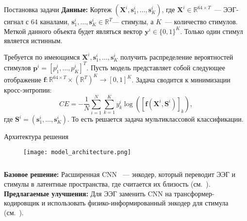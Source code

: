 \documentclass{beamer}
\begin{document}
\begin{frame}{Постановка задачи}
\textbf{Данные:} Кортеж $(\mathbf{X}^i, \mathbf{s}_1^i, \dots, \mathbf{s}_K^i)$, где $\mathbf{X}^i \in \mathbb{R}^{64 \times T}$~--- ЭЭГ-сигнал с 64 каналами, $\mathbf{s}_1^i, \dots, \mathbf{s}_K^i \in \mathbb{R}^{T}$--- стимулы, а $K$~--- количество стимулов. Меткой данного объекта будет являться вектор $\mathbf{y}^i \in \{0, 1\}^K$. Только один стимул является истинным. \bigskip

Требуется по имеющимся $\mathbf{X}^i, \mathbf{s}_1^i, \dots, \mathbf{s}_K^i$ получить распределение вероятностей стимулов $\mathbf{p}^i = [p_1^i, \dots , p_K^i]^T$. Пусть модель представляет собой следующее отображение $\mathbf{f} : \mathbb{R}^{64 \times T} \times \left( \mathbb{R}^{T} \right)^K \rightarrow [0, 1]^K$. Задача сводится к минимизации кросс-энтропии:
    $$CE = - \frac{1}{N}\sum_{i=1}^N\sum_{k=1}^K y_k^i \log \left( \left[ \mathbf{f}(\mathbf{X}^i, \mathbf{S}^i) \right]_k \right),$$
    где $\mathbf{S}^i = (\mathbf{s}^i_1, \dots, \mathbf{s}^i_K)$. То есть решается задача мультиклассовой классификации.

\end{frame}
\begin{frame}{Архитектура решения}
\begin{figure}[t]
        \centering
        \texttt{[image: model\_architecture.png]}
\end{figure}
\begin{columns}[c]
     \textbf{Базовое решение:} Расширенная CNN ~--- энкодер, который переводит ЭЭГ и стимулы в латентные пространства, где считается их близость (см.~\citep{Accou2021ModelingTR}).
     \textbf{Предлагаемые улучшения:}
     Для ЭЭГ заменить CNN на трансформер-кодировщик и использовать физико-информированный энкодер для стимула (см.~\citep{multihead-gru}). 
\end{columns}
\end{frame}
\end{document}
